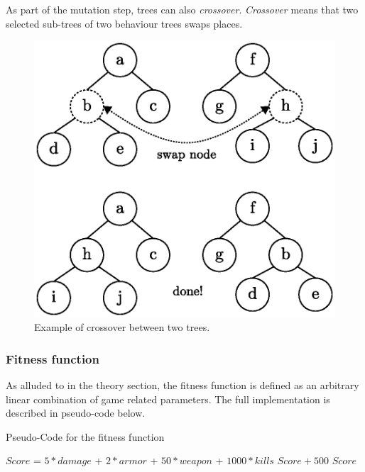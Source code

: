 \documentclass[a4paper, twocolumn]{article}
\begin{document}
        As part of the mutation step, trees can also \emph{crossover}. \emph{Crossover} means that two selected sub-trees of two behaviour trees swaps places.
        \begin{figure}[H]
            \centering
            \includegraphics[width=\linewidth]{share/node_swapping.eps}
            \caption{Example of crossover between two trees.}
            \label{fig:child_crossover}
        \end{figure}

        \subsubsection*{Fitness function}
        As alluded to in the theory section, the fitness function is defined as an arbitrary linear combination of game related parameters. The full implementation is described in pseudo-code below.
        \vspace{-0.4em}

        \begin{algorithm}[H]
            \caption{Pseudo-Code for the fitness function}
            \label{alg:fitness_function}
            \begin{algorithmic}
                $Score$ = $5 *damage$ + $2 * armor$ + $50 * weapon$ + $1000 * kills$
                    \RETURN $Score + 500$
                \ELSE
                    \RETURN $Score$
                \ENDIF
            \end{algorithmic}
        \end{algorithm}
        \vspace{-0.6em}
\end{document}
